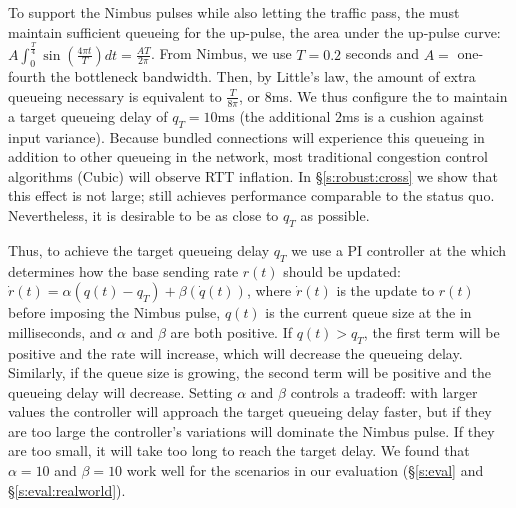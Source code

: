 To support the Nimbus pulses while also letting the traffic pass,
the \inbox must maintain sufficient queueing for the up-pulse,
\ie the area under the up-pulse curve: 
$A \int_0^{\frac{T}{4}} \sin(\frac{4\pi{}t}{T}) dt = \frac{AT}{2\pi}$.
From Nimbus, we use $T = 0.2$ seconds and $A =$ one-fourth the bottleneck bandwidth. Then, by Little's law, the amount of extra queueing necessary is equivalent to
$\frac{T}{8\pi}$, or $8$ms. %
We thus configure the \inbox to maintain a target queueing delay of $q_T = 10$ms (the additional $2$ms is a cushion against input variance).
Because bundled connections will experience this queueing in addition to other queueing in the network, 
most traditional congestion control algorithms (\eg Cubic) will observe RTT inflation. 
In \S\ref{s:robust:cross} we show that this effect is not large; \name still achieves performance comparable to the status quo. Nevertheless, it is desirable to be as close to $q_T$ as possible. 

Thus, to achieve the target queueing delay $q_T$
we use a PI controller at the \inbox which determines how the base sending rate $r(t)$ should be updated:
$\dot{r}(t) = \alpha (q(t) - q_T) + \beta (\dot{q}(t))$, where $\dot{r}(t)$ is the update to $r(t)$ before imposing the Nimbus pulse, $q(t)$ is the current queue size at the \inbox in milliseconds, and $\alpha$ and $\beta$ are both positive.
If $q(t) > q_T$, the first term will be positive and the rate will increase, which will decrease the queueing delay. Similarly, if the queue size is growing, the second term will be positive and the queueing delay will decrease. 
Setting $\alpha$ and $\beta$ controls a tradeoff: with larger values the controller will approach the target queueing delay faster, but if they are too large the controller's variations will dominate the Nimbus pulse. 
If they are too small, it will take too long to reach the target delay. 
We found that $\alpha=10$ and $\beta = 10$ work well for the scenarios in our evaluation (\S\ref{s:eval} and \S\ref{s:eval:realworld}).


